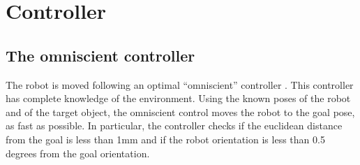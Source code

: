 \section{Controller}

\subsection{The omniscient controller}

The robot is moved following an optimal “omniscient” controller \cite{park2011smooth}. This controller has complete 
knowledge of the environment. Using the known poses of the robot and of the target object, the omniscient control moves 
the robot to the goal pose, as fast as possible. In particular, the controller checks if the euclidean distance from 
the goal is less than 1mm and if the robot orientation is less than 0.5 degrees from the goal orientation.
